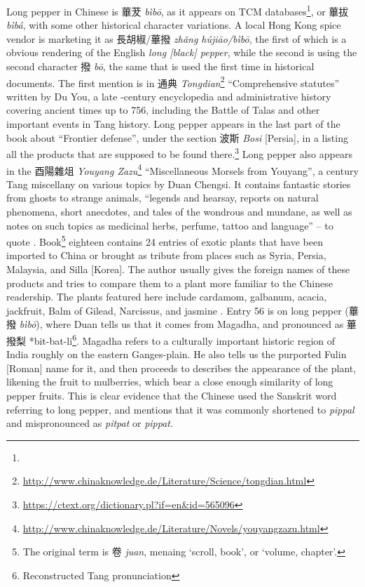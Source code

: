 Long pepper in Chinese is 蓽茇 \textit{bìbō}, as it appears on TCM databases\footnote{}, or 蓽拔 \textit{bìbá}, with some other historical character variations. A local Hong Kong spice vendor is marketing it as 長胡椒/蓽撥 \textit{zhǎng hújiāo/bìbō}, the first of which is a obvious rendering of the English \textit{long [black] pepper}, while the second is using the second character 撥 \textit{bō}, the same that is used the first time in historical documents. The first mention is in 通典 \textit{Tongdian}\footnote{\url{http://www.chinaknowledge.de/Literature/Science/tongdian.html}} ``Comprehensive statutes'' written by Du You, a late -century encyclopedia and administrative history covering ancient times up to 756, including the Battle of Talas and other important events in Tang history. Long pepper appears in the last part of the book about ``Frontier defense'', under the section 波斯 \textit{Bosi} [Persia], in a listing all the products that are supposed to be found there.\footnote{\url{https://ctext.org/dictionary.pl?if=en&id=565096}} Long pepper also appears in the 酉陽雜俎 \textit{Youyang Zazu}\footnote{\url{http://www.chinaknowledge.de/Literature/Novels/youyangzazu.html}} ``Miscellaneous Morsels from Youyang'', a  century Tang miscellany on various topics by Duan Chengsi. It contains fantastic stories from ghosts to strange animals, ``legends and hearsay, reports on natural phenomena, short anecdotes, and tales of the wondrous and mundane, as well as notes on such topics as medicinal herbs, perfume, tattoo and language'' -- to quote \textcite[1]{reed_youyang_1995}. Book\footnote{The original term is 卷 \textit{juan}, menaing `scroll, book', or `volume, chapter'.} eighteen contains 24 entries of exotic plants that have been imported to China or brought as tribute from places such as Syria, Persia, Malaysia, and Silla [Korea]. The author usually gives the foreign names of these products and tries to compare them to a plant more familiar to the Chinese readership. The plants featured here include cardamom, galbanum, acacia, jackfruit, Balm of Gilead, Narcissus, and jasmine \parencite[68]{reed_youyang_1995}. Entry 56 is on long pepper (蓽撥 \textit{bìbō}), where Duan tells us that it comes from Magadha, and pronounced as 蓽撥梨 *bit-bat-li\footnote{Reconstructed Tang pronunciation}. Magadha refers to a culturally important historic region of India roughly on the eastern Ganges-plain. He also tells us the purported Fulin [Roman] name for it, and then proceeds to describes the appearance of the plant, likening the fruit to mulberries, which bear a close enough similarity of long pepper fruits. This is clear evidence that the Chinese used the Sanskrit word referring to long pepper, and \textcite[151]{schafer_golden_1985} mentions that it was commonly shortened to \textit{pippal} and mispronounced as \textit{pitpat} or \textit{pippat}. 

